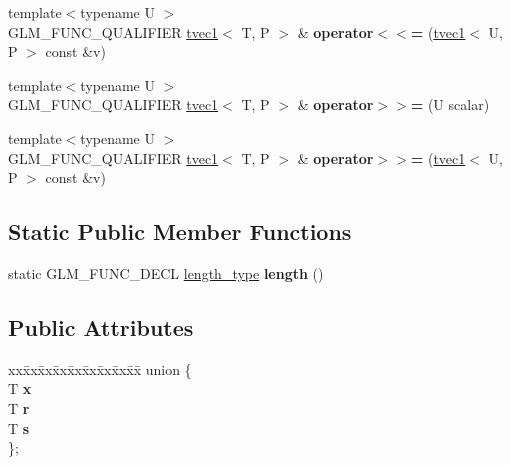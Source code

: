 \begin{DoxyCompactItemize}
\item 
\mbox{\label{structglm_1_1tvec1_a758704df3a9b6ecab58bcfa9baf7582b}} 
{\footnotesize template$<$typename U $>$ }\\G\+L\+M\+\_\+\+F\+U\+N\+C\+\_\+\+Q\+U\+A\+L\+I\+F\+I\+ER \hyperlink{structglm_1_1tvec1}{tvec1}$<$ T, P $>$ \& {\bfseries operator$<$$<$=} (\hyperlink{structglm_1_1tvec1}{tvec1}$<$ U, P $>$ const \&v)
\item 
\mbox{\label{structglm_1_1tvec1_a664c0b0509ecb502caee8e9f20edc287}} 
{\footnotesize template$<$typename U $>$ }\\G\+L\+M\+\_\+\+F\+U\+N\+C\+\_\+\+Q\+U\+A\+L\+I\+F\+I\+ER \hyperlink{structglm_1_1tvec1}{tvec1}$<$ T, P $>$ \& {\bfseries operator$>$$>$=} (U scalar)
\item 
\mbox{\label{structglm_1_1tvec1_a7412ce02e214e4f036ce87a8f7a3f32e}} 
{\footnotesize template$<$typename U $>$ }\\G\+L\+M\+\_\+\+F\+U\+N\+C\+\_\+\+Q\+U\+A\+L\+I\+F\+I\+ER \hyperlink{structglm_1_1tvec1}{tvec1}$<$ T, P $>$ \& {\bfseries operator$>$$>$=} (\hyperlink{structglm_1_1tvec1}{tvec1}$<$ U, P $>$ const \&v)
\end{DoxyCompactItemize}
\subsection*{Static Public Member Functions}
\begin{DoxyCompactItemize}
\item 
\mbox{\label{structglm_1_1tvec1_aa25cb652c92eb83b9ef027d82365bb01}} 
static G\+L\+M\+\_\+\+F\+U\+N\+C\+\_\+\+D\+E\+CL \hyperlink{structglm_1_1tvec1_ae6254cf662020a8328b744b40f419527}{length\+\_\+type} {\bfseries length} ()
\end{DoxyCompactItemize}
\subsection*{Public Attributes}
\begin{DoxyCompactItemize}
\item 
\mbox{\label{structglm_1_1tvec1_a5e360a89c0b940369a803d4255b5418d}} 
\begin{tabbing}
xx\=xx\=xx\=xx\=xx\=xx\=xx\=xx\=xx\=\kill
union \{\\
\>T {\bfseries x}\\
\>T {\bfseries r}\\
\>T {\bfseries s}\\
\}; \\

\end{tabbing}\end{DoxyCompactItemize}


